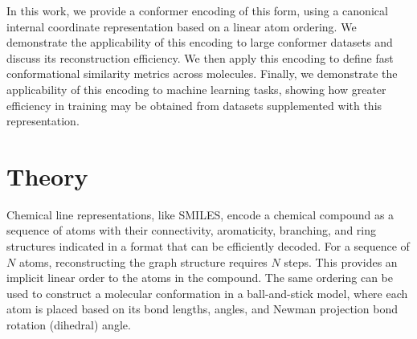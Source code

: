 \documentclass[%
 preprint,
superscriptaddress,
 amsmath,amssymb,
 aip,
 jcp,
]{revtex4-2}
\begin{document}



In this work, we provide a conformer encoding of this form, using a canonical internal coordinate representation based on a linear atom ordering.
We demonstrate the applicability of this encoding to large conformer datasets and discuss its reconstruction efficiency.
We then apply this encoding to define fast conformational similarity metrics across molecules.
Finally, we demonstrate the applicability of this encoding to machine learning tasks, showing how greater efficiency in training may be obtained from datasets supplemented with this representation.


\section{Theory}

Chemical line representations, like SMILES, encode a chemical compound as a sequence of atoms with their connectivity, aromaticity, branching, and ring structures indicated in a format that can be efficiently decoded.
For a sequence of $N$ atoms, reconstructing the graph structure requires $N$ steps.
This provides an implicit linear order to the atoms in the compound.
The same ordering can be used to construct a molecular conformation in a ball-and-stick model, where each atom is placed based on its bond lengths, angles, and Newman projection bond rotation (dihedral) angle.\cite{Newman1955:projection}
\end{document}
